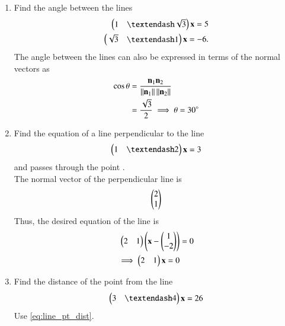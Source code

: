 \begin{enumerate}[label=\arabic*.,ref=\thesubsection.\theenumi]
%
\item Find the angle between the lines 
%
\begin{align}
\myvec{1 & – \sqrt{3}}\vec{x}  = 5
\\
\myvec{\sqrt{3} & –1}\vec{x}  = -6
. 
\end{align}
%
\solution The angle between the lines can also be expressed in terms of the normal vectors as
%
\begin{align}
\cos \theta &= \frac{\mathbf{n}_1\mathbf{n}_2}{\left\lVert\mathbf{n}_1\right\rVert\left\lVert\mathbf{n}_2\right\rVert}
\\
&= \frac{\sqrt{3}}{2} \implies \theta = 30\degree
\end{align}
%
\item Find the equation of a line perpendicular to the line 
\begin{align}
\myvec{1 & – 2}\vec{x}  = 3
\end{align}
%
and passes through the point .
%
\\
\solution The normal vector of the perpendicular line is 
%
\begin{align}
\begin{pmatrix}2 \\ 1\end{pmatrix}
\end{align}
%
Thus, the desired equation of the line is 
%
\begin{align}
\begin{pmatrix}2 & 1\end{pmatrix}\left(\mathbf{x} - \begin{pmatrix}1\\-2\end{pmatrix}\right) &=0
\\
\implies \begin{pmatrix}2 & 1\end{pmatrix}\mathbf{x} =0
\end{align}
%

\item Find the distance of the point  from the line 
\begin{align}
\myvec{3 & – 4}\vec{x}  = 26
\end{align}
%
\solution Use \eqref{eq:line_pt_dist}.


\end{enumerate}
